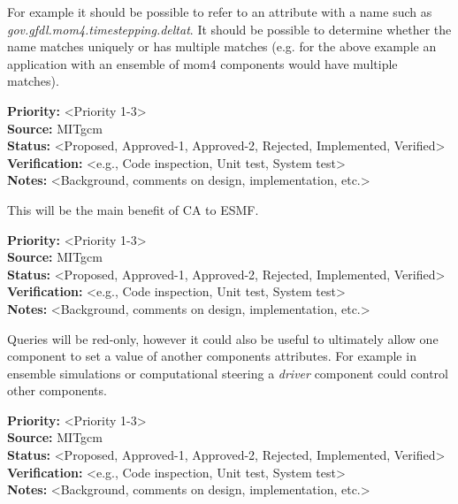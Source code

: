 For example it should be possible to refer to an attribute with a
name such as {\it gov.gfdl.mom4.timestepping.deltat}. It should
be possible to determine whether the name matches uniquely or has
multiple matches (e.g. for the above example an application
with an ensemble of mom4 components would have multiple matches).

\begin{reqlist}
{\bf Priority:} <Priority 1-3> \\
{\bf Source:} MITgcm \\
{\bf Status:} <Proposed, Approved-1, Approved-2, Rejected, Implemented, Verified> \\
{\bf Verification:} <e.g., Code inspection, Unit test, System test> \\
{\bf Notes:} <Background, comments on design, implementation, etc.> 
\end{reqlist}

This will be the main benefit of CA to ESMF.

\begin{reqlist}
{\bf Priority:} <Priority 1-3> \\
{\bf Source:} MITgcm \\
{\bf Status:} <Proposed, Approved-1, Approved-2, Rejected, Implemented, Verified> \\
{\bf Verification:} <e.g., Code inspection, Unit test, System test> \\
{\bf Notes:} <Background, comments on design, implementation, etc.> 
\end{reqlist}

Queries will be red-only, however it could also be useful to ultimately allow 
one component to set a value of another components attributes. For example in
ensemble simulations or computational steering a {\it driver} component could
control other components.

\begin{reqlist}
{\bf Priority:} <Priority 1-3> \\
{\bf Source:} MITgcm \\
{\bf Status:} <Proposed, Approved-1, Approved-2, Rejected, Implemented, Verified> \\
{\bf Verification:} <e.g., Code inspection, Unit test, System test> \\
{\bf Notes:} <Background, comments on design, implementation, etc.> 
\end{reqlist}
